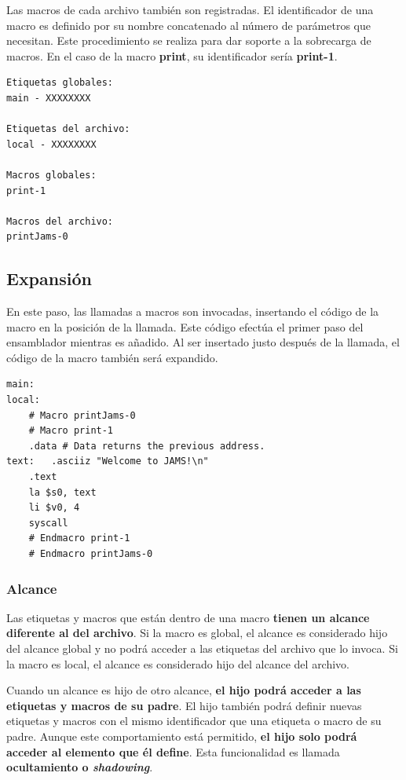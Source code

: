\noindent Las macros de cada archivo también son registradas.
El identificador de una macro es definido por su nombre concatenado
al número de parámetros que necesitan.
Este procedimiento se realiza para dar soporte a la sobrecarga de macros.
En el caso de la macro \textbf{print}, su identificador sería \textbf{print-1}.

\begin{lstlisting}[frame=single,label={lst:descubrimiento}]
Etiquetas globales:
main - XXXXXXXX

Etiquetas del archivo:
local - XXXXXXXX

Macros globales:
print-1

Macros del archivo:
printJams-0
\end{lstlisting}

\subsection{Expansión}\label{subsec:expansion}

En este paso, las llamadas a macros son invocadas,
insertando el código de la macro en la posición de la llamada.
Este código efectúa el primer paso del ensamblador mientras es añadido.
Al ser insertado justo después de la llamada, el código de la macro
también será expandido.

\begin{lstlisting}[frame=single,label={lst:expansion}]
main:
local:
    # Macro printJams-0
    # Macro print-1
    .data # Data returns the previous address.
text:   .asciiz "Welcome to JAMS!\n"
    .text
    la $s0, text
    li $v0, 4
    syscall
    # Endmacro print-1
    # Endmacro printJams-0
\end{lstlisting}

\subsubsection{Alcance}\label{subsubsec:alcance}

Las etiquetas y macros que están dentro de una macro
\textbf{tienen un alcance diferente al del archivo}.
Si la macro es global, el alcance es considerado hijo del alcance global
y no podrá acceder a las etiquetas del archivo que lo invoca.
Si la macro es local, el alcance es considerado hijo del alcance del archivo.

\noindent Cuando un alcance es hijo de otro alcance,
\textbf{el hijo podrá acceder a las etiquetas y macros de su padre}.
El hijo también podrá definir nuevas etiquetas y macros con el mismo
identificador que una etiqueta o macro de su padre.
Aunque este comportamiento está permitido, \textbf{el hijo solo podrá acceder
al elemento que él define}.
Esta funcionalidad es llamada \textbf{ocultamiento o \textit{shadowing}}.

